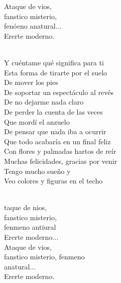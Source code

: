 \documentclass[12pt]{article}
\begin{document}
\begin{multicols*}{2}
\begin{cancion}
\begin{chorus}
                Ataque de vios,\\
                fanstico misterio, \\
                fenóeno anatural...\\
                Ererte moderno.\\
                \end{chorus}%
                \jump\\
        Y cuéntame qué significa para ti\\
        Esta forma de tirarte por el suelo\\
        De mover los pies\\
        De soportar un espectáculo al revés\\
        De no dejarme nada claro\\
        De perder la cuenta de las veces\\
        Que mordí el anzuelo\\
        De pensar que nada iba a ocurrir\\
        Que todo acabaría en un final feliz\\
        Con flores y palmadas hartos de reír\\
        Muchas felicidades, gracias por venir\\
        Tengo mucho sueño y\\
        Veo colores y figuras en el techo\\\jump\\
                \begin{chorus}%
                taque de nios,\\
                fanstico misterio, \\
                fenmeno antiural \\
                Ererte moderno...\\
                Ataque de vios,\\
                fanstico misterio, fenmeno  \\
                anatural...\\
                Ererte moderno.\\
                \end{chorus}%
                \jump\\
        \end{cancion}%


\end{multicols*}
\end{document}
